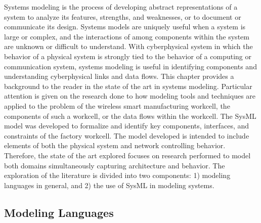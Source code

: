 Systems modeling is the process of developing abstract representations of a system to analyze its features, strengths, and weaknesses, or to document or communicate its design.  Systems models are uniquely useful when a system is large or complex, and the interactions of among components within the system are unknown or difficult to understand.  With cyberphysical system in which the behavior of a physical system is strongly tied to the behavior of a computing or communication system, systems modeling is useful in identifying components and understanding cyberphysical links and data flows.   This chapter provides a background to the reader in the state of the art in systems modeling.  Particular attention is given on the research done to how modeling tools and techniques are applied to the problem of the wireless smart manufacturing workcell, the components of such a workcell, or the data flows within the workcell.  The SysML model was developed to formalize and identify key components, interfaces, and constraints of the factory workcell.  The model developed is intended to include elements of both the physical system and network controlling behavior.  Therefore, the state of the art explored focuses on research performed to model both domains simultaneously capturing architecture and behavior.  The exploration of the literature is divided into two components: 1) modeling languages in general, and 2) the use of SysML in modeling systems.

\subsection{Modeling Languages} \label{sysml:sec:languages}

